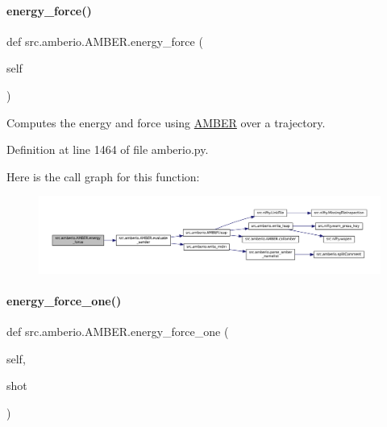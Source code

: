\paragraph{\texorpdfstring{energy\+\_\+force()}{energy\_force()}}
{\footnotesize\ttfamily def src.\+amberio.\+A\+M\+B\+E\+R.\+energy\+\_\+force (\begin{DoxyParamCaption}\item[{}]{self }\end{DoxyParamCaption})}



Computes the energy and force using \hyperlink{classsrc_1_1amberio_1_1AMBER}{A\+M\+B\+ER} over a trajectory. 



Definition at line 1464 of file amberio.\+py.

Here is the call graph for this function\+:
\nopagebreak
\begin{figure}[H]
\begin{center}
\leavevmode
\includegraphics[width=350pt]{classsrc_1_1amberio_1_1AMBER_ab2237300f0b314b61e034c1d43504d2c_cgraph}
\end{center}
\end{figure}
\mbox{\label{classsrc_1_1amberio_1_1AMBER_a6b67c489b262f485c3c71664ae241759}} 
\paragraph{\texorpdfstring{energy\+\_\+force\+\_\+one()}{energy\_force\_one()}}
{\footnotesize\ttfamily def src.\+amberio.\+A\+M\+B\+E\+R.\+energy\+\_\+force\+\_\+one (\begin{DoxyParamCaption}\item[{}]{self,  }\item[{}]{shot }\end{DoxyParamCaption})}



